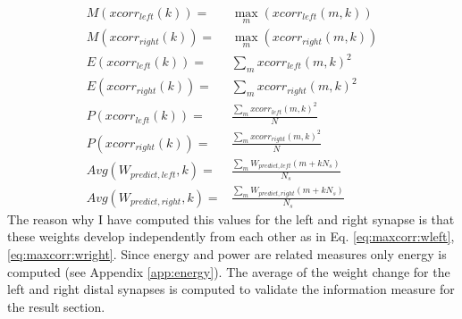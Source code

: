 \begin{eqnarray}
M(xcorr_{left}(k))=& \max\limits_{m}(xcorr_{left}(m,k)) \label{eq.maxcorr:mleft}\\
M(xcorr_{right}(k))=& \max\limits_{m}(xcorr_{right}(m,k)) \label{eq.maxcorr:mright}\\
E(xcorr_{left}(k))=& \sum\limits_{m} xcorr_{left}(m,k)^2  \\ 
E(xcorr_{right}(k))=& \sum\limits_{m} xcorr_{right}(m,k)^2 \\ 
P(xcorr_{left}(k))=& \frac{\sum\limits_{m} xcorr_{left}(m,k)^2}{N} \\
P(xcorr_{right}(k))=& \frac{\sum\limits_{m} xcorr_{right}(m,k)^2}{N} \\
Avg(W_{predict,left},k)=&\frac{\sum\limits_{m} W_{predict,left}(m+k N_{s})}{N_{s}} \\
Avg(W_{predict,right},k)=& \frac{\sum\limits_{m} W_{predict,right}(m+k N_{s})}{N_{s}}
\end{eqnarray}
The reason why I have computed this values for the left and right synapse is that
these weights develop independently from each other as in Eq. \ref{eq:maxcorr:wleft},\ref{eq:maxcorr:wright}.
Since energy and power are related measures only energy is computed (see Appendix \ref{app:energy}).
The average of the weight change for the left and right distal synapses is computed
 to validate the information measure for the result section.

